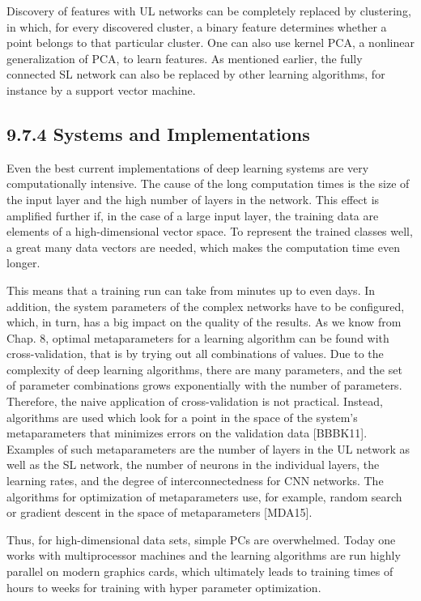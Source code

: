 \documentclass[10pt]{article}
\begin{document}
Discovery of features with UL networks can be completely replaced by clustering, in which, for every discovered cluster, a binary feature determines whether a point belongs to that particular cluster. One can also use kernel PCA, a nonlinear generalization of PCA, to learn features. As mentioned earlier, the fully connected SL network can also be replaced by other learning algorithms, for instance by a support vector machine.

\subsection*{9.7.4 Systems and Implementations}
Even the best current implementations of deep learning systems are very computationally intensive. The cause of the long computation times is the size of the input layer and the high number of layers in the network. This effect is amplified further if, in the case of a large input layer, the training data are elements of a high-dimensional vector space. To represent the trained classes well, a great many data vectors are needed, which makes the computation time even longer.

This means that a training run can take from minutes up to even days. In addition, the system parameters of the complex networks have to be configured, which, in turn, has a big impact on the quality of the results. As we know from Chap. 8, optimal metaparameters for a learning algorithm can be found with cross-validation, that is by trying out all combinations of values. Due to the complexity of deep learning algorithms, there are many parameters, and the set of parameter combinations grows exponentially with the number of parameters. Therefore, the naive application of cross-validation is not practical. Instead, algorithms are used which look for a point in the space of the system's metaparameters that minimizes errors on the validation data [BBBK11]. Examples of such metaparameters are the number of layers in the UL network as well as the SL network, the number of neurons in the individual layers, the learning rates, and the degree of interconnectedness for CNN networks. The algorithms for optimization of metaparameters use, for example, random search or gradient descent in the space of metaparameters [MDA15].

Thus, for high-dimensional data sets, simple PCs are overwhelmed. Today one works with multiprocessor machines and the learning algorithms are run highly parallel on modern graphics cards, which ultimately leads to training times of hours to weeks for training with hyper parameter optimization.
\end{document}
